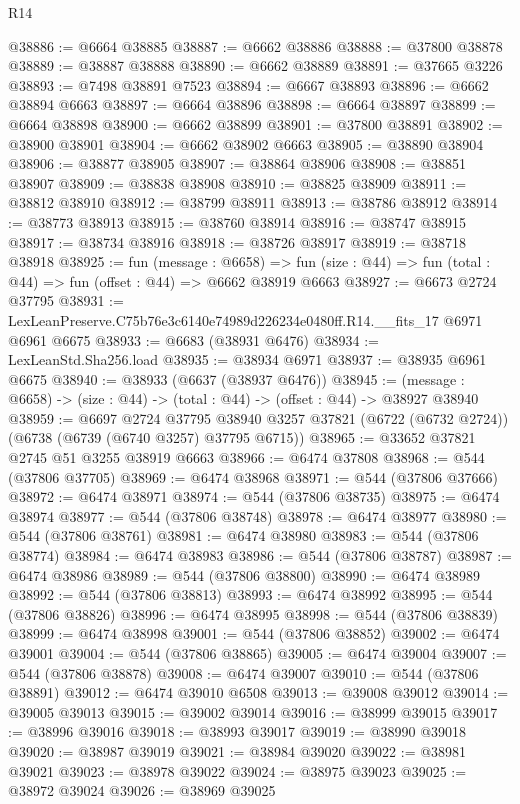 \begin{lexlean}{R14}
\begin{coremodule}
@38886 := @6664 @38885
@38887 := @6662 @38886
@38888 := @37800 @38878
@38889 := @38887 @38888
@38890 := @6662 @38889
@38891 := @37665 @3226
@38893 := @7498 @38891 @7523
@38894 := @6667 @38893
@38896 := @6662 @38894 @6663
@38897 := @6664 @38896
@38898 := @6664 @38897
@38899 := @6664 @38898
@38900 := @6662 @38899
@38901 := @37800 @38891
@38902 := @38900 @38901
@38904 := @6662 @38902 @6663
@38905 := @38890 @38904
@38906 := @38877 @38905
@38907 := @38864 @38906
@38908 := @38851 @38907
@38909 := @38838 @38908
@38910 := @38825 @38909
@38911 := @38812 @38910
@38912 := @38799 @38911
@38913 := @38786 @38912
@38914 := @38773 @38913
@38915 := @38760 @38914
@38916 := @38747 @38915
@38917 := @38734 @38916
@38918 := @38726 @38917
@38919 := @38718 @38918
@38925 := fun (message : @6658) =>
  fun (size : @44) => fun (total : @44) => fun (offset : @44) => @6662 @38919 @6663
@38927 := @6673 @2724 @37795
@38931 := LexLeanPreserve.C75b76e3c6140e74989d226234e0480ff.R14.__fits_17 @6971 @6961 @6675
@38933 := @6683 (@38931 @6476)
@38934 := LexLeanStd.Sha256.load
@38935 := @38934 @6971
@38937 := @38935 @6961 @6675
@38940 := @38933 (@6637 (@38937 @6476))
@38945 := (message : @6658) -> (size : @44) -> (total : @44) -> (offset : @44) -> @38927 @38940
@38959 := @6697
    @2724
    @37795
    @38940
    @3257
    @37821
    (@6722 (@6732 @2724))
    (@6738 (@6739 (@6740 @3257) @37795 @6715))
@38965 := @33652 @37821 @2745 @51 @3255 @38919 @6663
@38966 := @6474 @37808
@38968 := @544 (@37806 @37705)
@38969 := @6474 @38968
@38971 := @544 (@37806 @37666)
@38972 := @6474 @38971
@38974 := @544 (@37806 @38735)
@38975 := @6474 @38974
@38977 := @544 (@37806 @38748)
@38978 := @6474 @38977
@38980 := @544 (@37806 @38761)
@38981 := @6474 @38980
@38983 := @544 (@37806 @38774)
@38984 := @6474 @38983
@38986 := @544 (@37806 @38787)
@38987 := @6474 @38986
@38989 := @544 (@37806 @38800)
@38990 := @6474 @38989
@38992 := @544 (@37806 @38813)
@38993 := @6474 @38992
@38995 := @544 (@37806 @38826)
@38996 := @6474 @38995
@38998 := @544 (@37806 @38839)
@38999 := @6474 @38998
@39001 := @544 (@37806 @38852)
@39002 := @6474 @39001
@39004 := @544 (@37806 @38865)
@39005 := @6474 @39004
@39007 := @544 (@37806 @38878)
@39008 := @6474 @39007
@39010 := @544 (@37806 @38891)
@39012 := @6474 @39010 @6508
@39013 := @39008 @39012
@39014 := @39005 @39013
@39015 := @39002 @39014
@39016 := @38999 @39015
@39017 := @38996 @39016
@39018 := @38993 @39017
@39019 := @38990 @39018
@39020 := @38987 @39019
@39021 := @38984 @39020
@39022 := @38981 @39021
@39023 := @38978 @39022
@39024 := @38975 @39023
@39025 := @38972 @39024
@39026 := @38969 @39025

\end{coremodule}
\end{lexlean}
